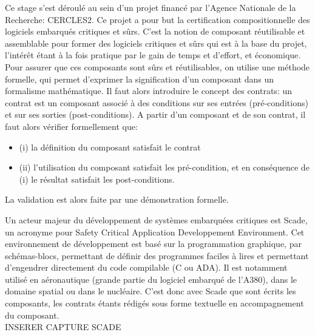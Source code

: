 

Ce stage s'est déroulé au sein d'un projet financé par l'Agence
Nationale de la Recherche: CERCLES2. Ce projet a pour but la
certification compositionnelle des logiciels embarqués critiques et
sûrs. C'est la notion de composant réutilisable et assemblable pour former des
logiciels critiques et sûrs qui est à la base du projet, l'intérêt étant à la fois
pratique par le gain de temps et d'effort, et économique. \\

Pour assurer que ces composants sont sûrs et réutilisables, on
utilise une méthode formelle, qui permet d'exprimer la signification d'un
composant dans un formalisme mathématique. Il faut alors introduire le concept des
contrats: un contrat est un composant associé à des conditions sur ses entrées
(pré-conditions) et sur ses sorties (post-conditions). 
A partir d'un composant et de son contrat, il faut alors vérifier formellement
que:
\begin{itemize}
\item  (i) la définition du composant satisfait le contrat
\item (ii) l'utilisation du composant satisfait les pré-condition, et en
conséquence de (i) le résultat satisfait les post-conditions.
\end{itemize}
La validation est alors faite par une démonstration formelle.

Un acteur majeur du développement de systèmes embarquées critiques est Scade,
un acronyme pour Safety Critical Application Developpement Environment. Cet
environnement de développement est basé sur la programmation graphique, par
schémas-blocs, permettant de définir des programmes faciles à lires et
permettant d'engendrer directement du code compilable (C ou ADA). Il est
notamment utilisé en aéronautique (grande partie du logiciel embarqué de
l'A380), dans le domaine spatial ou dans le nucléaire. C'est donc avec Scade
que sont écrits les composants, les contrats étants rédigés sous forme
textuelle en accompagnement du composant.\\

INSERER CAPTURE SCADE\\

